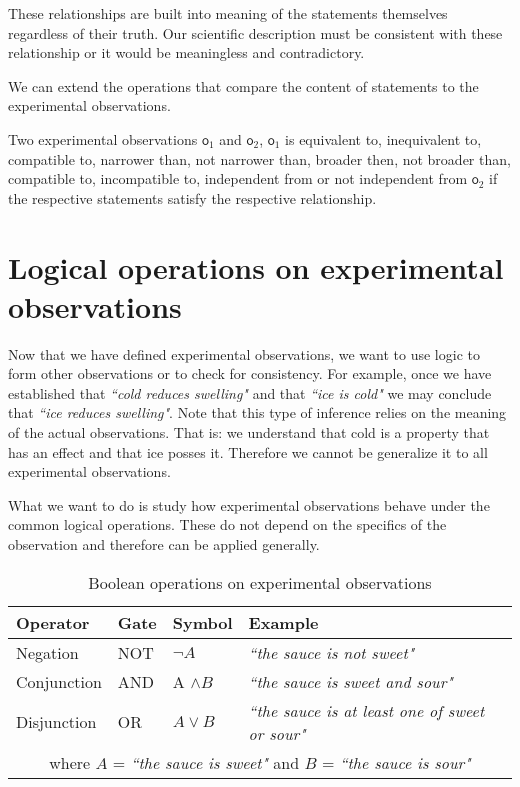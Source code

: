 \documentclass[11pt,letterpaper,fleqn]{memoir} %
\begin{document}
These relationships are built into meaning of the statements themselves regardless of their truth. Our scientific description must be consistent with these relationship or it would be meaningless and contradictory.

\begin{mathSection}

We can extend the operations that compare the content of statements to the experimental observations.

\begin{defn}
	Two experimental observations $\mathsf{o}_1$ and $\mathsf{o}_2$, $\mathsf{o}_1$ is equivalent to, inequivalent to, compatible to, narrower than, not narrower than, broader then, not broader than, compatible to, incompatible to, independent from or not independent from $\mathsf{o}_2$ if the respective statements satisfy the respective relationship.
\end{defn}

\end{mathSection}

\section{Logical operations on experimental observations}

Now that we have defined experimental observations, we want to use logic to form other observations or to check for consistency. For example, once we have established that \emph{``cold reduces swelling"} and that \emph{``ice is cold"} we may conclude that \emph{``ice 
reduces swelling"}. Note that this type of inference relies on the meaning of the actual observations. That is: we understand that cold is a property that has an effect and that ice posses it. Therefore we cannot be generalize it to all experimental observations.

What we want to do is study how experimental observations behave under the common logical operations. These do not depend on the specifics of the observation and therefore can be applied generally.
\begin{table}[h]
	\centering
	\begin{tabular}{p{} p{} p{} p{}}
		Operator & Gate & Symbol & Example \\ 
		\hline 
		Negation & NOT & $\neg A$ &  \emph{``the sauce is not sweet"} \\ 
		Conjunction & AND & A $\wedge B$ & \emph{``the sauce is sweet and sour"} \\ 
		Disjunction & OR & $A \vee B$ & \emph{``the sauce is at least one of sweet or sour"}\\
		\multicolumn{4}{c}{  where $A$ = \emph{``the sauce is sweet"} and $B$ = \emph{``the sauce is sour"}}
	\end{tabular} 
	\caption{Boolean operations on experimental observations}
\end{table}
\end{document}
